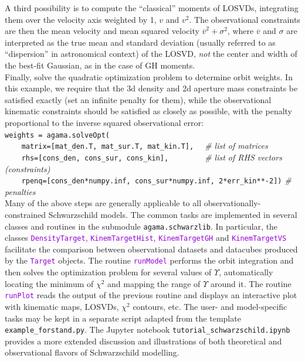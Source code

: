 \documentclass[12pt]{article}
\newcommand{\ttt}[1]{\textcolor{darkviolet}{\texttt{#1}}}
\begin{document}
A third possibility is to compute the ``classical'' moments of LOSVDs, integrating them over the velocity axis weighted by 1, $v$ and $v^2$.
The observational constraints are then the mean velocity and mean squared velocity ${\overline v}^2 + \sigma^2$, where $\overline v$ and $\sigma$ are interpreted as the true mean and standard deviation (usually referred to as ``dispersion'' in astronomical context) of the LOSVD, \textit{not} the center and width of the best-fit Gaussian, as in the case of GH moments.\\[2mm]
Finally, solve the quadratic optimization problem to determine orbit weights. In this example, we require that the 3d density and 2d aperture mass constraints be satisfied exactly (set an infinite penalty for them), while the observational kinematic constraints should be satisfied as closely as possible, with the penalty proportional to the inverse squared observational error:\\[2mm]
\texttt{weights = agama.solveOpt(\\
\mbox{}~~~~matrix=[mat_den.T, mat_sur.T, mat_kin.T],}
\textit{\color{Sepia} \ \ \# list of matrices}\\
\texttt{\mbox{}~~~~rhs=[cons_den, cons_sur, cons_kin],~~~~~~\mbox{}}
\textit{\color{Sepia} \ \ \# list of RHS vectors (constraints)}\\
\texttt{\mbox{}~~~~rpenq=[cons_den*numpy.inf, cons_sur*numpy.inf, 2*err_kin**-2])}
\textit{\color{Sepia}\# penalties}\\[3mm]
Many of the above steps are generally applicable to all observationally-constrained Schwarzschild models. The common tasks are implemented in several classes and routines in the submodule \texttt{agama.schwarzlib}. In particular, the classes \ttt{DensityTarget}, \ttt{KinemTargetHist}, \ttt{KinemTargetGH} and \ttt{KinemTargetVS} facilitate the comparison between observational datasets and datacubes produced by the \ttt{Target} objects. The routine \ttt{runModel} performs the orbit integration and then solves the optimization problem for several values of $\Upsilon$, automatically locating the minimum of $\chi^2$ and mapping the range of $\Upsilon$ around it. The routine \ttt{runPlot} reads the output of the previous routine and displays an interactive plot with kinematic maps, LOSVDs, $\chi^2$ contours, etc. The user- and model-specific tasks may be kept in a separate script adapted from the template \texttt{example_forstand.py}. The Jupyter notebook \texttt{tutorial_schwarzschild.ipynb} provides a more extended discussion and illustrations of both theoretical and observational flavors of Schwarzschild modelling.
\end{document}
